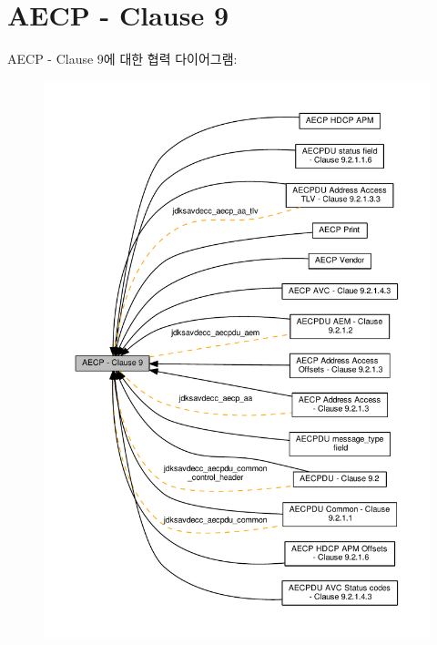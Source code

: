 \hypertarget{group__aecp}{}\section{A\+E\+CP -\/ Clause 9}
\label{group__aecp}
A\+E\+CP -\/ Clause 9에 대한 협력 다이어그램\+:
\nopagebreak
\begin{figure}[H]
\begin{center}
\leavevmode
\includegraphics[width=350pt]{group__aecp}
\end{center}
\end{figure}
